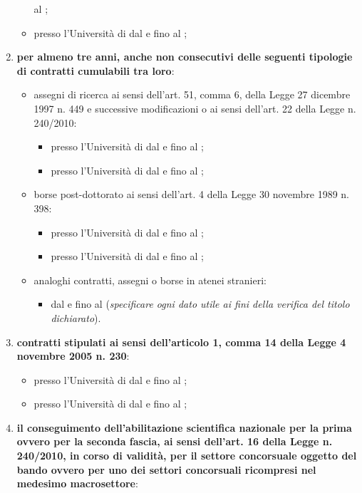 \documentclass[a4paper,10pt]{article}
\begin{document}
\begin{Form}
\begin{enumerate}
\begin{itemize}
 al \myTextField{};
 \item presso l’Università di \myTextField[4.5cm]{} dal \myTextField{} e fino 
 al \myTextField{};
\end{itemize}
\item \textbf{per almeno tre anni, anche non consecutivi delle seguenti tipologie 
di contratti cumulabili tra loro}:
\begin{itemize}
\item assegni di ricerca ai sensi dell’art. 51, comma 6, della Legge 27 dicembre
 1997 n. 449 e successive modificazioni o ai sensi dell’art. 22 della Legge n. 240/2010:
\begin{itemize}
 \item presso l’Università di \myTextField[4.5cm]{} dal \myTextField{} e fino 
 al \myTextField{};
 \item presso l’Università di \myTextField[4.5cm]{} dal \myTextField{} e fino 
 al \myTextField{};
\end{itemize}
\item borse post-dottorato ai sensi dell’art. 4 della Legge 30 novembre 1989 
n. 398:
\begin{itemize}
 \item presso l’Università di \myTextField[4.5cm]{} dal \myTextField{} e fino 
 al \myTextField{};
 \item presso l’Università di \myTextField[4.5cm]{} dal \myTextField{} e fino 
 al \myTextField{};
\end{itemize}
\item analoghi contratti, assegni o borse in atenei stranieri:
\begin{itemize}
\item dal \myTextField{} e fino al \myTextField{} (\emph{specificare ogni dato 
utile ai fini della verifica del titolo dichiarato}).
\end{itemize}
\end{itemize}
\item \textbf{contratti stipulati ai sensi dell’articolo 1, comma 14 della 
Legge 4 novembre 2005 n. 230}:
\begin{itemize}
 \item presso l’Università di \myTextField[4.5cm]{} dal \myTextField{} e fino 
 al \myTextField{};
 \item presso l’Università di \myTextField[4.5cm]{} dal \myTextField{} e fino 
 al \myTextField{};
\end{itemize}
\item \textbf{il conseguimento dell’abilitazione scientifica nazionale per la 
prima ovvero per la seconda fascia, ai sensi dell’art. 16 della Legge n. 
240/2010, in corso di validità, per il settore concorsuale oggetto del bando 
ovvero per uno dei settori concorsuali ricompresi nel medesimo macrosettore}:


\end{enumerate}
\end{Form}
\end{document}
